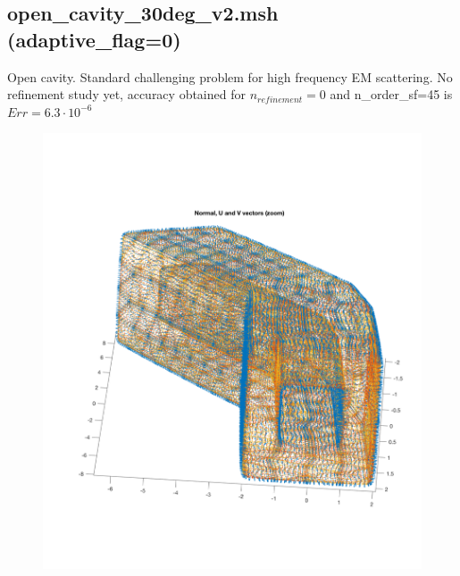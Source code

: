 \documentclass[11pt, oneside]{article}   	%
\begin{document}
\newpage
\subsection{open\_cavity\_30deg\_v2.msh (adaptive\_flag=0)}
Open cavity. Standard challenging problem for high frequency EM scattering. No refinement study yet, accuracy obtained for $n_{refinement}=0$ and n\_order\_sf=45 is $Err=6.3\cdot 10^{-6}$
\begin{figure}[H]
\begin{center}
\includegraphics[width=5.5in]{open_cavity_basis.pdf}
\end{center}
\caption{}
\label{open_cavity_basis}
\end{figure}
\end{document}
